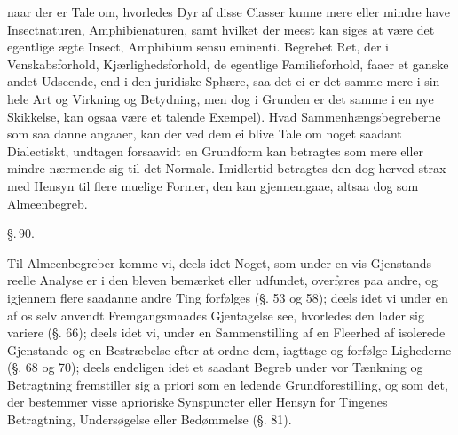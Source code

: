 \documentclass[12pt]{book}
\def\textit#1{#1}%
\def\emph#1{#1}%
\newcommand{\parag}[1]{%
  \par\vspace{0.9\baselineskip}%
  {\centering\textit{\S.\,#1.}\par}%
  \vspace{0.35\baselineskip}%
  \noindent\hspace{\parindent}\ignorespaces
}
\newcommand{\opage}[1]{\marginnote{\footnotesize\textit{[#1]}}}
\begin{document}
naar der er Tale om, hvorledes Dyr af disse Classer kunne mere eller mindre have
\emph{Insectnaturen}, \emph{Amphibienaturen}, samt hvilket der meest kan siges at være
det egentlige ægte \emph{Insect}, \emph{Amphibium} \textit{sensu eminenti}. Begrebet
\emph{Ret}, der i Venskabsforhold, Kjærlighedsforhold, de egentlige Familieforhold,
faaer et ganske andet Udseende, end i den juridiske Sphære, saa det ei er det samme mere
i sin hele Art og Virkning og Betydning, men dog i Grunden er det samme i en nye
Skikkelse, kan ogsaa være et talende Exempel). Hvad Sammenhængsbegreberne som saa%
\opage{233}danne angaaer, kan der ved dem ei blive Tale om noget saadant Dialectiskt, undtagen
forsaavidt en Grundform kan betragtes som mere eller mindre nærmende sig til det
Normale. Imidlertid betragtes den dog herved strax med Hensyn til flere muelige Former,
den kan gjennemgaae, altsaa dog som Almeenbegreb.

\parag{90}

Til \emph{Almeenbegreber} komme vi, deels idet Noget, som under en vis Gjenstands reelle
Analyse er i den bleven bemærket eller udfundet, overføres paa andre, og igjennem flere
saadanne andre Ting forfølges (§. 53 og 58); deels idet vi under en af os selv anvendt
Fremgangsmaades Gjentagelse see, hvorledes den lader sig variere (§. 66); deels idet vi,
under en Sammenstilling af en Fleerhed af isolerede Gjenstande og en Bestræbelse efter
at ordne dem, iagttage og forfølge Lighederne (§. 68 og 70); deels endeligen idet et
saadant Begreb under vor Tænkning og Betragtning fremstiller sig \textit{a priori} som
en ledende Grundforestilling, og som det, der bestemmer visse aprioriske Synspuncter
eller Hensyn for Tingenes Betragtning, Undersøgelse eller Bedømmelse (§. 81).
\end{document}
